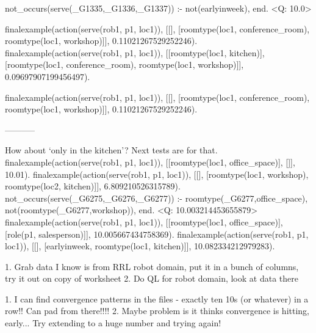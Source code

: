 not_occurs(serve(_G1335,_G1336,_G1337)) :- not(earlyinweek), end.
<Q: 10.0>

finalexample(action(serve(rob1, p1, loc1)), [[], [roomtype(loc1, conference_room), roomtype(loc1, workshop)]], 0.11021267529252246).
finalexample(action(serve(rob1, p1, loc1)), [[roomtype(loc1, kitchen)], [roomtype(loc1, conference_room), roomtype(loc1, workshop)]], 0.09697907199456497).

finalexample(action(serve(rob1, p1, loc1)), [[], [roomtype(loc1, conference_room), roomtype(loc1, workshop)]], 0.11021267529252246).

-----------

How about `only in the kitchen'?
Next tests are for that.
finalexample(action(serve(rob1, p1, loc1)), [[roomtype(loc1, office_space)], []], 10.01).
finalexample(action(serve(rob1, p1, loc1)), [[], [roomtype(loc1, workshop), roomtype(loc2, kitchen)]], 6.809210526315789).
not_occurs(serve(_G6275,_G6276,_G6277)) :- roomtype(_G6277,office_space), not(roomtype(_G6277,workshop)), end.
<Q: 10.003214453655879>
finalexample(action(serve(rob1, p1, loc1)), [[roomtype(loc1, office_space)], [role(p1, salesperson)]], 10.005667434758369).
finalexample(action(serve(rob1, p1, loc1)), [[], [earlyinweek, roomtype(loc1, kitchen)]], 10.082334212979283).


1. Grab data I know is from RRL robot domain, put it in a bunch of columns, try it out on copy of worksheet
2. Do QL for robot domain, look at data there



1. I can find convergence patterns in the files - exactly ten 10s (or whatever) in a row!!
Can pad from there!!!!
2. Maybe problem is it thinks convergence is hitting, early... Try extending to a huge number and trying again!




